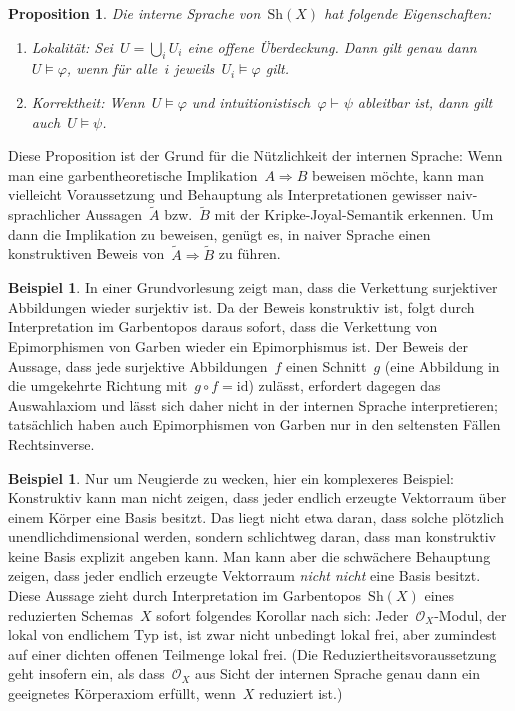 \documentclass[a4paper,ngerman,12pt]{scrartcl}
\theoremstyle{definition}
\newtheorem{bsp}[defn]{Beispiel}
\theoremstyle{plain}
\newtheorem{prop}[defn]{Proposition}
\theoremstyle{remark}
\renewcommand{\O}{\mathcal{O}}
\newcommand{\Sh}{\mathrm{Sh}}
\newcommand{\id}{\mathrm{id}}
\newcommand{\seq}[1]{\mathrel{\vdash\!\!\!_{#1}}}
\renewcommand{\_}{\mathpunct{.}\,}
\newcommand{\?}{\,{:}\,}
\begin{document}
\begin{prop}
Die interne Sprache von~$\Sh(X)$ hat folgende Eigenschaften:
\begin{enumerate}
\item \emph{Lokalität:} Sei~$U = \bigcup_i U_i$ eine offene Überdeckung. Dann
gilt genau dann~$U \models \varphi$, wenn für alle~$i$ jeweils~$U_i \models
\varphi$ gilt.
\item \emph{Korrektheit:} Wenn~$U \models \varphi$ und
intuitionistisch~$\varphi \seq{} \psi$ ableitbar ist, dann gilt auch~$U \models
\psi$.
\end{enumerate}
\end{prop}

Diese Proposition ist der Grund für die Nützlichkeit der internen Sprache: Wenn
man eine garbentheoretische Implikation~$A \Rightarrow B$ beweisen möchte, kann man vielleicht
Voraussetzung und Behauptung als Interpretationen gewisser naiv-sprachlicher
Aussagen~$\tilde A$ bzw.~$\tilde B$ mit der Kripke-Joyal-Semantik erkennen. Um
dann die Implikation zu beweisen, genügt es, in naiver Sprache einen
konstruktiven Beweis von~$\tilde A \Rightarrow \tilde B$ zu führen.

\begin{bsp}In einer Grundvorlesung zeigt man, dass die Verkettung surjektiver
Abbildungen wieder surjektiv ist. Da der Beweis konstruktiv ist, folgt durch
Interpretation im Garbentopos daraus sofort, dass die Verkettung von
Epimorphismen von Garben wieder ein Epimorphismus ist. Der Beweis der Aussage, dass jede
surjektive Abbildungen~$f$ einen Schnitt~$g$ (eine Abbildung in die umgekehrte
Richtung mit~$g \circ f = \id$) zulässt, erfordert dagegen das Auswahlaxiom und
lässt sich daher nicht in der internen Sprache interpretieren; tatsächlich
haben auch Epimorphismen von Garben nur in den seltensten Fällen Rechtsinverse.\end{bsp}

\begin{bsp}Nur um Neugierde zu wecken, hier ein komplexeres Beispiel:
Konstruktiv kann man nicht zeigen, dass jeder endlich erzeugte Vektorraum über
einem Körper eine Basis besitzt. Das liegt nicht etwa daran, dass solche
plötzlich unendlichdimensional werden, sondern schlichtweg daran, dass man
konstruktiv keine Basis explizit angeben kann. Man kann aber die schwächere
Behauptung zeigen, dass jeder endlich erzeugte Vektorraum \emph{nicht nicht}
eine Basis besitzt. Diese Aussage zieht durch Interpretation im
Garbentopos~$\Sh(X)$ eines reduzierten Schemas~$X$ sofort folgendes Korollar
nach sich: Jeder~$\O_X$-Modul, der lokal von endlichem Typ ist, ist zwar nicht
unbedingt lokal frei, aber zumindest auf einer dichten offenen Teilmenge lokal
frei. (Die Reduziertheitsvoraussetzung geht insofern ein, als dass~$\O_X$ aus
Sicht der internen Sprache genau dann ein geeignetes Körperaxiom erfüllt,
wenn~$X$ reduziert ist.)\end{bsp}
\end{document}
